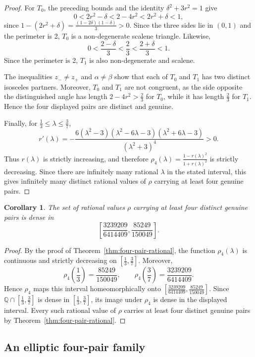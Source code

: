 \documentclass[11pt]{amsart}
\theoremstyle{plain}
\newtheorem{coro}[thm]{Corollary}
\theoremstyle{remark}
\theoremstyle{plain}
\newcommand{\Q}{\mathbb{Q}}
\begin{document}
\begin{proof}
For $T_0$, the preceding bounds and the identity
$\delta^2+3r^2=1$ give
\[
0<2r^2-\delta
<
2-4r^2
<
2r^2+\delta
<1,
\]
since $1-(2r^2+\delta)
=\frac{(1-2\delta)(1-\delta)}{3}>0.$ Since the three sides lie in $(0,1)$ and the perimeter is 2,  $T_0$ is a non-degenerate scalene triangle. Likewise,
\[
0<
\frac{2-\delta}{3}
<
\frac23
<
\frac{2+\delta}{3}
<1.
\]
Since the perimeter is 2,  $T_1$ is also non-degenerate and scalene.

The inequalities $z_-\ne z_+$ and $\alpha\ne \beta$ show that each of
$T_0$ and $T_1$ has two distinct isosceles partners. Moreover,
$T_0$ and $T_1$ are not congruent, as  the side opposite the distinguished
angle has length
$2-4r^2>\frac23$
for $T_0$, while it has length $\frac23$ for $T_1$. Hence the four
displayed pairs are distinct and genuine.

Finally, for $\frac13\leq\lambda\leq\frac37$,
\[
r'(\lambda)
=
-\frac{
6(\lambda^2-3)(\lambda^2-6\lambda-3)
(\lambda^2+6\lambda-3)}
{(\lambda^2+3)^4}
>0.
\]Thus $r(\lambda)$ is strictly
increasing, and therefore
$\rho_4(\lambda)=\frac{1-r(\lambda)^2}{1+r(\lambda)^2}$
is strictly decreasing. Since there are infinitely many rational
$\lambda$ in the stated interval, this gives infinitely many distinct
rational values of $\rho$ carrying at least four genuine pairs.
\end{proof}
\begin{coro}\label{cor:four-pair-density}
The set of rational values $\rho$ carrying at least four distinct
genuine pairs is dense in
\[
\left[
\frac{3239209}{6414409},
\frac{85249}{150049}
\right].
\]
\end{coro}

\begin{proof}
By the proof of Theorem~\ref{thm:four-pair-rational}, the function
$\rho_4(\lambda)$ is continuous and strictly decreasing on
$\left[\frac13,\frac37\right]$.
Moreover,
\[
\rho_4\left(\frac13\right)
=
\frac{85249}{150049},
\qquad
\rho_4\left(\frac37\right)
=
\frac{3239209}{6414409}.
\]
Hence $\rho_4$ maps this interval homeomorphically onto
$\left[ \frac{3239209}{6414409}, \frac{85249}{150049} \right]$.
Since $\Q\cap[\frac13,\frac37]$ is dense in
$[\frac13,\frac37]$, its image under $\rho_4$ is dense in the
displayed interval. Every such rational value of $\rho$ carries at
least four distinct genuine pairs by
Theorem~\ref{thm:four-pair-rational}.
\end{proof}


\subsection{An elliptic four-pair family}
\end{document}
